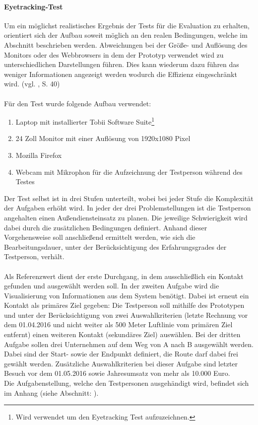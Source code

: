 \documentclass[Bachelorarbeit.tex]{subfiles}
\begin{document}
\paragraph{Eyetracking-Test}
Um ein möglichst realistisches Ergebnis der Tests für die Evaluation zu erhalten, orientiert sich der Aufbau soweit möglich an den realen Bedingungen, welche im Abschnitt  beschrieben werden.
Abweichungen bei der Größe- und Auflösung des Monitors oder des Webbrowsers in dem der Prototyp verwendet wird zu unterschiedlichen Darstellungen führen. 
Dies kann wiederum dazu führen das weniger Informationen angezeigt werden wodurch die Effizienz eingeschränkt wird. (vgl. \cite{Ollermann2007}, S. 40)\\
\\
Für den Test wurde folgende Aufbau verwendet:
\begin{enumerate}
	\item Laptop mit installierter Tobii Software Suite\footnote{Wird verwendet um den Eyetracking Test aufzuzeichnen.}
	\item 24 Zoll Monitor mit einer Auflösung von 1920x1080 Pixel
	\item Mozilla Firefox
	\item Webcam mit Mikrophon für die Aufzeichnung der Testperson während des Testes
\end{enumerate}

Der Test selbst ist in drei Stufen unterteilt, wobei bei jeder Stufe die Komplexität der Aufgaben erhöht wird. 
In jeder der drei Problemstellungen ist die Testperson angehalten einen Außendiensteinsatz zu planen. 
Die jeweilige Schwierigkeit wird dabei durch die zusätzlichen Bedingungen definiert.
Anhand dieser Vorgehensweise soll anschließend ermittelt werden, wie sich die Bearbeitungsdauer, unter der Berücksichtigung des Erfahrungsgrades der Testperson, verhält. \\
\\
Als Referenzwert dient der erste Durchgang, in dem ausschließlich ein Kontakt gefunden und ausgewählt werden soll. 
In der zweiten Aufgabe wird die Visualisierung von Informationen aus dem System benötigt. 
Dabei ist erneut ein Kontakt als primäres Ziel gegeben: Die Testperson soll mithilfe des Prototypen und unter der Berücksichtigung von zwei Auswahlkriterien (letzte Rechnung vor dem 01.04.2016 und nicht weiter als 500 Meter Luftlinie vom primären Ziel entfernt) einen weiteren Kontakt (sekundäres Ziel) auswählen. 
Bei der dritten Aufgabe sollen drei Unternehmen auf dem Weg von A nach B ausgewählt werden.
Dabei sind der Start- sowie der Endpunkt definiert, die Route darf dabei frei gewählt werden. 
Zusätzliche Auswahlkriterien bei dieser Aufgabe sind letzter Besuch vor dem 01.05.2016 sowie Jahresumsatz von mehr als 10.000 Euro.
\\
Die Aufgabenstellung, welche den Testpersonen ausgehändigt wird, befindet sich im Anhang (siehe Abschnitt: ).
\end{document}
